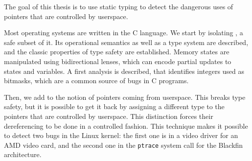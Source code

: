 \begin{headingpage}
The goal of this thesis is to use static typing to detect the dangerous uses of
pointers that are controlled by userspace.

Most operating systems are written in the C language. We start by isolating
\langname{}, a safe subset of it. Its operational semantics as well as a type
system are described, and the classic properties of type safety are established.
Memory states are manipulated using bidirectional lenses, which can encode
partial updates to states and variables. A first analysis is described, that
identifies integers used as bitmasks, which are a common source of bugs in C
programs.

Then, we add to \langname the notion of pointers coming from userspace. This
breaks type safety, but it is possible to get it back by assigning a different
type to the pointers that are controlled by userspace. This distinction forces
their dereferencing to be done in a controlled fashion. This technique makes it
possible to detect two bugs in the Linux kernel: the first one is in a video
driver for an AMD video card, and the second one in the \texttt{ptrace} system
call for the Blackfin architecture.





\end{headingpage}
\restoregeometry{}

